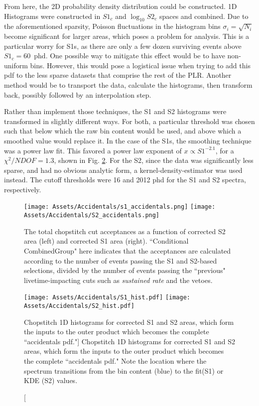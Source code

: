 From here, the 2D probability density distribution could be constructed.
1D Histograms were constructed in $S1_c$ and $\log_{10}S2_c$ spaces and combined.
Due to the aforementioned sparsity, Poisson fluctuations in the histogram bins $\sigma_i = \sqrt{N_i}$ become significant for larger areas, which poses a problem for analysis.
This is a particular worry for S1s, as there are only a few dozen surviving events above $S1_c=60$~phd.
One possible way to mitigate this effect would be to have non-uniform bins. 
However, this would pose a logistical issue when trying to add this pdf to the less sparse datasets that comprise the rest of the PLR.
Another method would be to transport the data, calculate the histograms, then transform back, possibly followed by an interpolation step.

Rather than implement those techniques, the S1 and S2 histograms were transformed in slightly different ways.
For both, a particular threshold was chosen such that below which the raw bin content would be used, and above which a smoothed value would replace it.
In the case of the S1s, the smoothing technique was a power law fit.
This favored a power law exponent of $x\propto S1^{-2.1}$, for a $\chi^2/NDOF=1.3$, shown in Fig. \ref{fig:chopstitch_histograms}.
For the S2, since the data was significantly less sparse, and had no obvious analytic form, a kernel-density-estimator\cite{hastie_elements_2001} was used instead.
The cutoff thresholds were 16 and 2012 phd for the S1 and S2 spectra, respectively. 


\begin{figure}
    \centering
    \texttt{[image: Assets/Accidentals/s1\_accidentals.png]}
    \texttt{[image: Assets/Accidentals/S2\_accidentals.png]}
    \caption[The total chopstitch cut acceptances as a function of corrected S2 area (left) and corrected S1 area (right).]%
    {The total chopstitch cut acceptances as a function of corrected S2 area (left) and corrected S1 area (right).
    ``Conditional CombinedGroup" here indicates that the acceptances are calculated according to the number of events passing the S1 and S2-based selections, divided by the number of events passing the ``previous" livetime-impacting cuts such as \textit{sustained rate} and the vetoes.}
    \label{fig:chopstitch_dqeval}
\end{figure}
\begin{figure}
    \centering
    \texttt{[image: Assets/Accidentals/S1\_hist.pdf]}
    \texttt{[image: Assets/Accidentals/S2\_hist.pdf]}
    \caption[Chopstitch 1D histograms for corrected S1 and S2 areas, which form the inputs to the outer product which becomes the complete ``accidentals pdf."]%
    {Chopstitch 1D histograms for corrected S1 and S2 areas, which form the inputs to the outer product which becomes the complete ``accidentals pdf."
    Note the location where the spectrum transitions from the bin content (blue) to the fit(S1) or KDE (S2) values.}
    \label{fig:chopstitch_histograms}
\end{figure}

